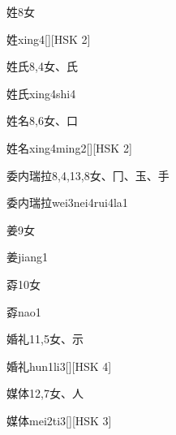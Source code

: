 \begin{entry}{姓}{8}{⼥}
  \begin{phonetics}{姓}{xing4}[][HSK 2]
  \end{phonetics}
\end{entry}

\begin{entry}{姓氏}{8,4}{⼥、⽒}
  \begin{phonetics}{姓氏}{xing4shi4}
  \end{phonetics}
\end{entry}

\begin{entry}{姓名}{8,6}{⼥、⼝}
  \begin{phonetics}{姓名}{xing4ming2}[][HSK 2]
  \end{phonetics}
\end{entry}

\begin{entry}{委内瑞拉}{8,4,13,8}{⼥、⼌、⽟、⼿}
  \begin{phonetics}{委内瑞拉}{wei3nei4rui4la1}
  \end{phonetics}
\end{entry}

\begin{entry}{姜}{9}{⼥}
  \begin{phonetics}{姜}{jiang1}
  \end{phonetics}
\end{entry}

\begin{entry}{孬}{10}{⼥}
  \begin{phonetics}{孬}{nao1}
  \end{phonetics}
\end{entry}

\begin{entry}{婚礼}{11,5}{⼥、⽰}
  \begin{phonetics}{婚礼}{hun1li3}[][HSK 4]
  \end{phonetics}
\end{entry}

\begin{entry}{媒体}{12,7}{⼥、⼈}
  \begin{phonetics}{媒体}{mei2ti3}[][HSK 3]
  \end{phonetics}
\end{entry}

